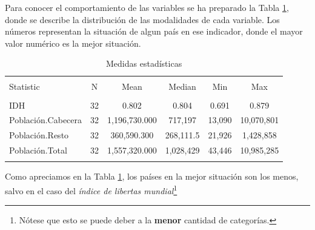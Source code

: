 \documentclass{article}
\begin{document}
 Para conocer el comportamiento de las variables se ha preparado la Tabla \ref{stats}, donde se describe la distribución de las modalidades de cada variable. Los números representan la situación de algun país en ese indicador, donde el mayor valor numérico es la mejor situación.
% 
\begin{table}[!htbp] \centering 
  \caption{Medidas estadísticas} 
  \label{stats} 
\begin{tabular}{@{\extracolsep{5pt}}lccccc} 
\\[-1.8ex]\hline 
\hline \\[-1.8ex] 
Statistic & \multicolumn{1}{c}{N} & \multicolumn{1}{c}{Mean} & \multicolumn{1}{c}{Median} & \multicolumn{1}{c}{Min} & \multicolumn{1}{c}{Max} \\ 
\hline \\[-1.8ex] 
IDH & 32 & 0.802 & 0.804 & 0.691 & 0.879 \\ 
Población.Cabecera & 32 & 1,196,730.000 & 717,197 & 13,090 & 10,070,801 \\ 
Población.Resto & 32 & 360,590.300 & 268,111.5 & 21,926 & 1,428,858 \\ 
Población.Total & 32 & 1,557,320.000 & 1,028,429 & 43,446 & 10,985,285 \\ 
\hline \\[-1.8ex] 
\end{tabular} 
\end{table} %
% 
 Como apreciamos en la Tabla \ref{stats}, los países en la mejor situación son los menos, salvo en el caso del \emph{índice de libertas mundial}\footnote{Nótese que esto se puede deber a la {\bf menor} cantidad de categorías.}
% 
\end{document}
